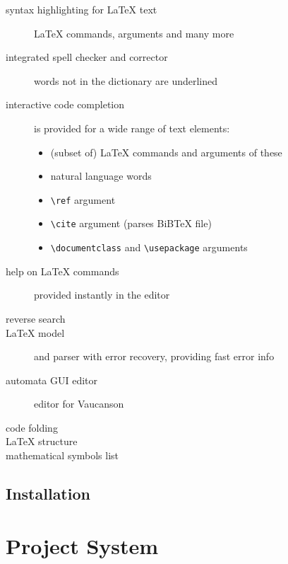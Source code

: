 \documentclass{article}
\newcommand{\lenv}{\LaTeX{} authoring environment\xspace}
\begin{document}
\begin{description}
\item[syntax highlighting for \LaTeX{} text]{\LaTeX{} commands, arguments and many more}
\item[integrated spell checker and corrector]{words not in the dictionary are underlined}
\item[interactive code completion]{is provided for a wide range of text elements:
\begin{itemize}
\item{(subset of) LaTeX{} commands and arguments of these}
\item{natural language words}
\item{\verb+\ref+ argument}
\item{\verb+\cite+ argument (parses BiBTeX file)}
\item{\verb+\documentclass+ and \verb+\usepackage+ arguments}
\end{itemize}
}
\item[help on LaTeX{} commands]{provided instantly in the editor}
\item[reverse search]{}
\item[\LaTeX{} model]{and parser with error recovery, providing fast error info}
\item[automata GUI editor]{editor for Vaucanson}
\item[code folding]{}
\item[\LaTeX{} structure]{}
\item[mathematical symbols list]{}
\end{description}

\subsection{Installation}

%



\section{Project System}
\end{document}
